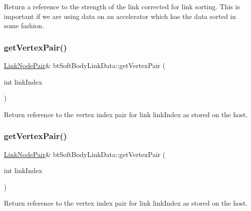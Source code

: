 Return a reference to the strength of the link corrected for link sorting. This is important if we are using data on an accelerator which has the data sorted in some fashion. \mbox{\label{classbtSoftBodyLinkData_ab0e3a69e9aec84ed318b3a3d17f57051}} 
\subsubsection{\texorpdfstring{get\+Vertex\+Pair()}{getVertexPair()}\hspace{0.1cm}{\footnotesize\ttfamily [1/2]}}
{\footnotesize\ttfamily \hyperlink{classbtSoftBodyLinkData_1_1LinkNodePair}{Link\+Node\+Pair}\& bt\+Soft\+Body\+Link\+Data\+::get\+Vertex\+Pair (\begin{DoxyParamCaption}\item[{int}]{link\+Index }\end{DoxyParamCaption})\hspace{0.3cm}{\ttfamily [inline]}}

Return reference to the vertex index pair for link link\+Index as stored on the host. \mbox{\label{classbtSoftBodyLinkData_ab0e3a69e9aec84ed318b3a3d17f57051}} 
\subsubsection{\texorpdfstring{get\+Vertex\+Pair()}{getVertexPair()}\hspace{0.1cm}{\footnotesize\ttfamily [2/2]}}
{\footnotesize\ttfamily \hyperlink{classbtSoftBodyLinkData_1_1LinkNodePair}{Link\+Node\+Pair}\& bt\+Soft\+Body\+Link\+Data\+::get\+Vertex\+Pair (\begin{DoxyParamCaption}\item[{int}]{link\+Index }\end{DoxyParamCaption})\hspace{0.3cm}{\ttfamily [inline]}}

Return reference to the vertex index pair for link link\+Index as stored on the host. \mbox{\label{classbtSoftBodyLinkData_a5018ad236aae590df94bca63c1ad7ee1}} 

